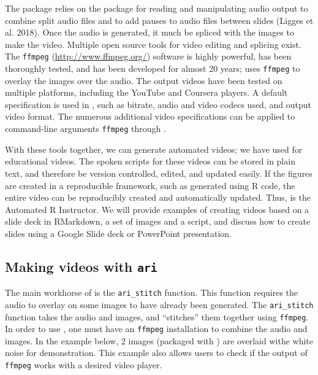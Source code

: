The  package relies on the  package for reading
and manipulating audio output to combine split audio files and to add
pauses to audio files between slides (Ligges et al. 2018). Once the
audio is generated, it much be spliced with the images to make the
video. Multiple open source tools for video editing and splicing exist.
The \texttt{ffmpeg} (\url{http://www.ffmpeg.org/}) software is highly
powerful, has been thoroughly tested, and has been developed for almost
20 years;  uses \texttt{ffmpeg} to overlay the images over the
audio. The output videos have been tested on multiple platforms,
including the YouTube and Coursera players. A default specification is
used in , such as bitrate, audio and video codecs used, and
output video format. The numerous additional video specifications can be
applied to command-line arguments \texttt{ffmpeg} through .

With these tools together, we can generate automated videos; we have
used  for educational videos. The spoken scripts for these
videos can be stored in plain text, and therefore be version controlled,
edited, and updated easily. If the figures are created in a reproducible
framework, such as generated using R code, the entire video can be
reproducibly created and automatically updated. Thus,  is the
Automated R Instructor. We will provide examples of creating videos
based on a slide deck in RMarkdown, a set of images and a script, and
discuss how to create slides using a Google Slide deck or PowerPoint
presentation.

\hypertarget{making-videos-with-ari}{%
\subsection{\texorpdfstring{Making videos with
\texttt{ari}}{Making videos with ari}}\label{making-videos-with-ari}}

The main workhorse of  is the \texttt{ari\_stitch} function.
This function requires the audio to overlay on some images to have
already been generated. The \texttt{ari\_stitch} function takes the
audio and images, and ``stitches'' them together using \texttt{ffmpeg}.
In order to use , one must have an \texttt{ffmpeg} installation
to combine the audio and images. In the example below, 2 images
(packaged with ) are overlaid withe white noise for
demonstration. This example also allows users to check if the output of
\texttt{ffmpeg} works with a desired video player.

